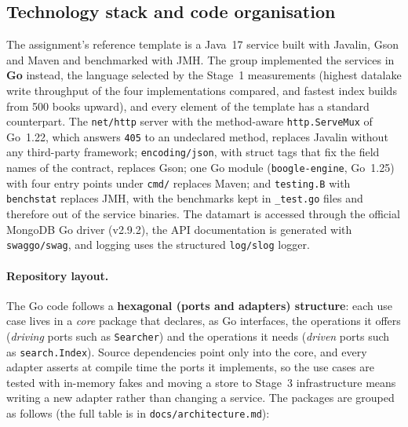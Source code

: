 \documentclass[10pt,a4paper]{article}
\newcommand{\code}[1]{\texttt{#1}}
\begin{document}
\subsection{Technology stack and code organisation}
\label{sec:stack}

The assignment's reference template is a Java~17 service built with Javalin,
Gson and Maven and benchmarked with JMH. The group implemented the services in
\textbf{Go} instead, the language selected by the Stage~1 measurements
(highest datalake write throughput of the four implementations compared, and
fastest index builds from 500 books upward), and every element of the template
has a standard counterpart. The \code{net/http} server with the method-aware
\code{http.ServeMux} of Go~1.22, which answers \code{405} to an undeclared
method, replaces Javalin without any third-party framework;
\code{encoding/json}, with struct tags that fix the field names of the
contract, replaces Gson; one Go module (\code{boogle-engine}, Go~1.25) with
four entry points under \code{cmd/} replaces Maven; and \code{testing.B} with
\code{benchstat} replaces JMH, with the benchmarks kept in \code{\_test.go}
files and therefore out of the service binaries. The datamart is accessed
through the official MongoDB Go driver (v2.9.2), the API documentation is
generated with \code{swaggo/swag}, and logging uses the structured
\code{log/slog} logger.

\paragraph{Repository layout.}
The Go code follows a \textbf{hexagonal (ports and adapters) structure}: each
use case lives in a \emph{core} package that declares, as Go interfaces, the
operations it offers (\emph{driving} ports such as \code{Searcher}) and the
operations it needs (\emph{driven} ports such as \code{search.Index}). Source
dependencies point only into the core, and every adapter asserts at compile
time the ports it implements, so the use cases are tested with in-memory fakes
and moving a store to Stage~3 infrastructure means writing a new adapter rather
than changing a service. The packages are grouped as follows (the full table is
in \code{docs/architecture.md}):
\end{document}
